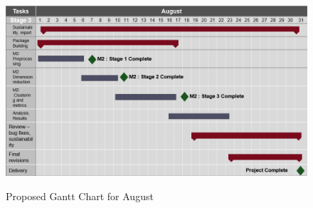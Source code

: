 \documentclass[project-plan]{report-template}
\begin{document}
\begin{figure}[htp]
    \begin{center}
        \includegraphics[width=1\textwidth]{gantt-august.png}
        \caption{}{Proposed Gantt Chart for August} 
    \end{center}
\end{figure}


\nocite{*}

\end{document}
